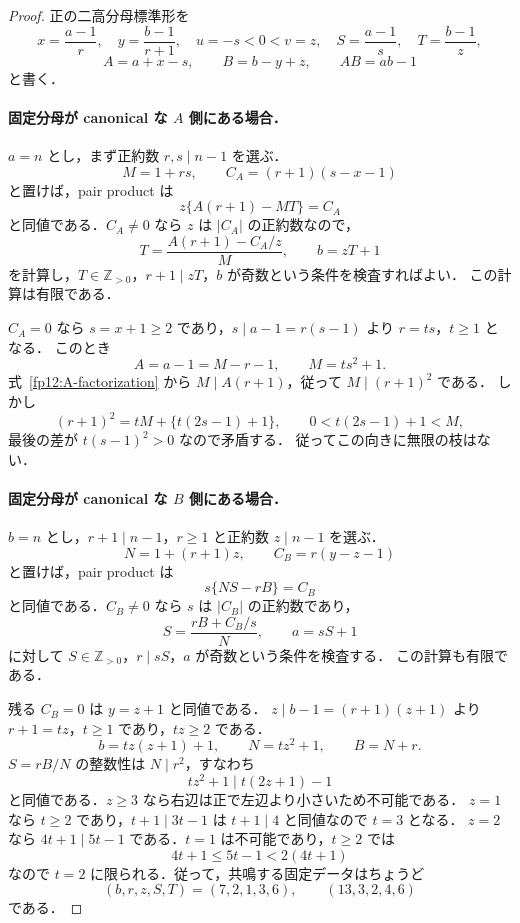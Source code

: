 \begin{proof}
正の二高分母標準形を
\[
 x=\frac{a-1}{r},\quad y=\frac{b-1}{r+1},\quad
 u=-s<0<v=z,\quad
 S=\frac{a-1}{s},\quad T=\frac{b-1}{z},
\]
\[
 A=a+x-s,\qquad B=b-y+z,\qquad AB=ab-1
\]
と書く．

\paragraph{固定分母が canonical な $A$ 側にある場合．}
$a=n$ とし，まず正約数 $r,s\mid n-1$ を選ぶ．
\[
 M=1+rs,\qquad C_A=(r+1)(s-x-1)
\]
と置けば，pair product は
\begin{equation}\label{fp12:A-factorization}
 z\{A(r+1)-MT\}=C_A
\end{equation}
と同値である．$C_A\ne0$ なら $z$ は $|C_A|$ の正約数なので，
\[
 T=\frac{A(r+1)-C_A/z}{M},\qquad b=zT+1
\]
を計算し，$T\in\mathbb Z_{>0}$，$r+1\mid zT$，$b$ が奇数という条件を検査すればよい．
この計算は有限である．

$C_A=0$ なら $s=x+1\geq2$ であり，$s\mid a-1=r(s-1)$ より $r=ts$，$t\geq1$ となる．
このとき
\[
 A=a-1=M-r-1,\qquad M=ts^2+1.
\]
式~\eqref{fp12:A-factorization} から $M\mid A(r+1)$，従って $M\mid(r+1)^2$ である．
しかし
\[
 (r+1)^2=tM+\{t(2s-1)+1\},\qquad
 0<t(2s-1)+1<M,
\]
最後の差が $t(s-1)^2>0$ なので矛盾する．
従ってこの向きに無限の枝はない．

\paragraph{固定分母が canonical な $B$ 側にある場合．}
$b=n$ とし，$r+1\mid n-1$，$r\geq1$ と正約数 $z\mid n-1$ を選ぶ．
\[
 N=1+(r+1)z,\qquad C_B=r(y-z-1)
\]
と置けば，pair product は
\begin{equation}\label{fp12:B-factorization}
 s\{NS-rB\}=C_B
\end{equation}
と同値である．$C_B\ne0$ なら $s$ は $|C_B|$ の正約数であり，
\[
 S=\frac{rB+C_B/s}{N},\qquad a=sS+1
\]
に対して $S\in\mathbb Z_{>0}$，$r\mid sS$，$a$ が奇数という条件を検査する．
この計算も有限である．

残る $C_B=0$ は $y=z+1$ と同値である．
$z\mid b-1=(r+1)(z+1)$ より $r+1=tz$，$t\geq1$ であり，$tz\geq2$ である．
\[
 b=tz(z+1)+1,\qquad N=tz^2+1,\qquad B=N+r.
\]
$S=rB/N$ の整数性は $N\mid r^2$，すなわち
\begin{equation}\label{fp12:resonance-divisibility}
 tz^2+1\mid t(2z+1)-1
\end{equation}
と同値である．$z\geq3$ なら右辺は正で左辺より小さいため不可能である．
$z=1$ なら $t\geq2$ であり，$t+1\mid3t-1$ は $t+1\mid4$ と同値なので $t=3$ となる．
$z=2$ なら $4t+1\mid5t-1$ である．$t=1$ は不可能であり，$t\geq2$ では
\[
 4t+1\leq5t-1<2(4t+1)
\]
なので $t=2$ に限られる．従って，共鳴する固定データはちょうど
\[
 (b,r,z,S,T)=(7,2,1,3,6),\qquad (13,3,2,4,6)
\]
である．


\end{proof}
